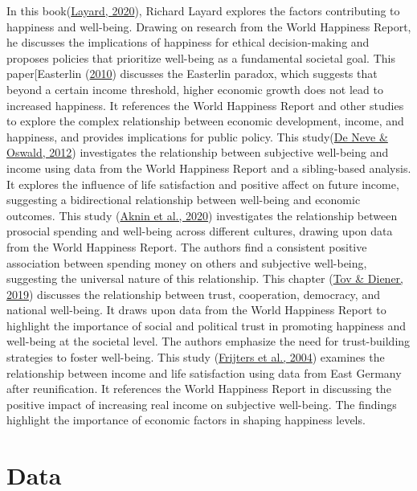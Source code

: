 \documentclass[
  12pt,
]{article}
\begin{document}
In this book(\protect\hyperlink{ref-layard2020can}{Layard, 2020}), Richard Layard explores the factors contributing to happiness and well-being. Drawing on research from the World Happiness Report, he discusses the implications of happiness for ethical decision-making and proposes policies that prioritize well-being as a fundamental societal goal. This paper{[}Easterlin (\protect\hyperlink{ref-easterlin2010happiness}{2010}) discusses the Easterlin paradox, which suggests that beyond a certain income threshold, higher economic growth does not lead to increased happiness. It references the World Happiness Report and other studies to explore the complex relationship between economic development, income, and happiness, and provides implications for public policy. This study(\protect\hyperlink{ref-deneve2012estimating}{De Neve \& Oswald, 2012}) investigates the relationship between subjective well-being and income using data from the World Happiness Report and a sibling-based analysis. It explores the influence of life satisfaction and positive affect on future income, suggesting a bidirectional relationship between well-being and economic outcomes. This study (\protect\hyperlink{ref-aknin2020prosocial}{Aknin et al., 2020}) investigates the relationship between prosocial spending and well-being across different cultures, drawing upon data from the World Happiness Report. The authors find a consistent positive association between spending money on others and subjective well-being, suggesting the universal nature of this relationship. This chapter (\protect\hyperlink{ref-tov2019wellbeing}{Tov \& Diener, 2019}) discusses the relationship between trust, cooperation, democracy, and national well-being. It draws upon data from the World Happiness Report to highlight the importance of social and political trust in promoting happiness and well-being at the societal level. The authors emphasize the need for trust-building strategies to foster well-being. This study (\protect\hyperlink{ref-frijters2004money}{Frijters et al., 2004}) examines the relationship between income and life satisfaction using data from East Germany after reunification. It references the World Happiness Report in discussing the positive impact of increasing real income on subjective well-being. The findings highlight the importance of economic factors in shaping happiness levels.

\hypertarget{data}{%
\section{Data}\label{data}}
\end{document}
